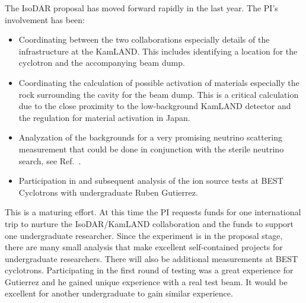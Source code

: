 The IsoDAR proposal has moved forward rapidly in the last year. The PI's involvement has been:
\begin{itemize}
 \item Coordinating between the two collaborations especially details of the infrastructure at the KamLAND. This includes identifying a location for the cyclotron and the accompanying beam dump.
 \item Coordinating the calculation of possible activation of materials especially the rock surrounding the cavity for the beam dump. This is a critical calculation due to the close proximity to the low-background KamLAND detector and the regulation for material activation in Japan.
 \item Analyzation of the backgrounds for a very promising neutrino scattering measurement that could be done in conjunction with the sterile neutrino search, see Ref.~\cite{isodarscatt}.
 \item Participation in and subsequent analysis of the ion source tests at BEST Cyclotrons with undergraduate Ruben Gutierrez.
\end{itemize}
This is a maturing effort. At this time the PI requests funds for one international trip to nurture the IsoDAR/KamLAND collaboration and the funds to support one undergraduate researcher. Since the experiment is in the proposal stage, there are many small analysis that make excellent self-contained projects for undergraduate researchers. There will also be additional measurements at BEST cyclotrons. Participating in the first round of testing was a great experience for Gutierrez and he gained unique experience with a real test beam.  It would be excellent for another undergraduate to gain similar experience.

